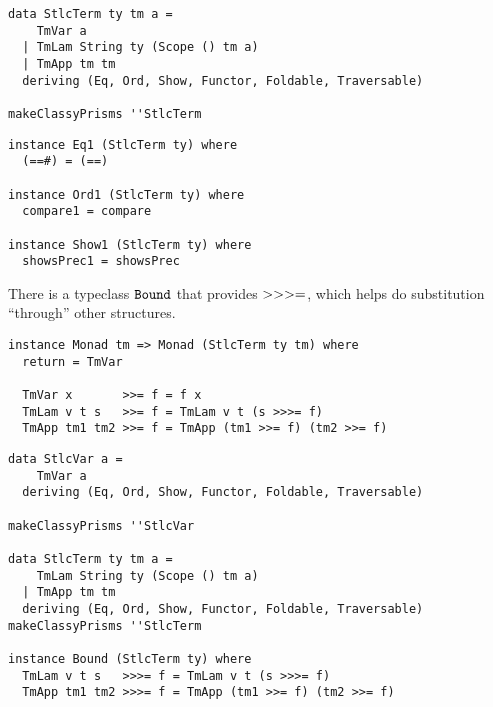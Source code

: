 \documentclass{beamer}
\begin{document}
\begin{frame}[fragile]
  \begin{verbatim}
data StlcTerm ty tm a =
    TmVar a
  | TmLam String ty (Scope () tm a)
  | TmApp tm tm
  deriving (Eq, Ord, Show, Functor, Foldable, Traversable)

makeClassyPrisms ''StlcTerm
  \end{verbatim}  
\end{frame}

\begin{frame}[fragile]
  \begin{verbatim}
instance Eq1 (StlcTerm ty) where
  (==#) = (==)

instance Ord1 (StlcTerm ty) where
  compare1 = compare

instance Show1 (StlcTerm ty) where
  showsPrec1 = showsPrec
  \end{verbatim}  
\end{frame}

\begin{frame}[c]
  \begin{center}
  There is a typeclass $\tt{Bound}$ that provides $\tt{>>>=}$, which helps do
  substitution ``through'' other structures.
  \end{center}
\end{frame}

\begin{frame}[fragile]
  \begin{verbatim}
instance Monad tm => Monad (StlcTerm ty tm) where
  return = TmVar 

  TmVar x       >>= f = f x
  TmLam v t s   >>= f = TmLam v t (s >>>= f)
  TmApp tm1 tm2 >>= f = TmApp (tm1 >>= f) (tm2 >>= f)
  \end{verbatim}  
\end{frame}

\begin{frame}[fragile]
  \begin{verbatim}
data StlcVar a =
    TmVar a
  deriving (Eq, Ord, Show, Functor, Foldable, Traversable)

makeClassyPrisms ''StlcVar

data StlcTerm ty tm a =
    TmLam String ty (Scope () tm a)
  | TmApp tm tm
  deriving (Eq, Ord, Show, Functor, Foldable, Traversable)
makeClassyPrisms ''StlcTerm

instance Bound (StlcTerm ty) where
  TmLam v t s   >>>= f = TmLam v t (s >>>= f)
  TmApp tm1 tm2 >>>= f = TmApp (tm1 >>= f) (tm2 >>= f)
  \end{verbatim}  
\end{frame}
\end{document}
